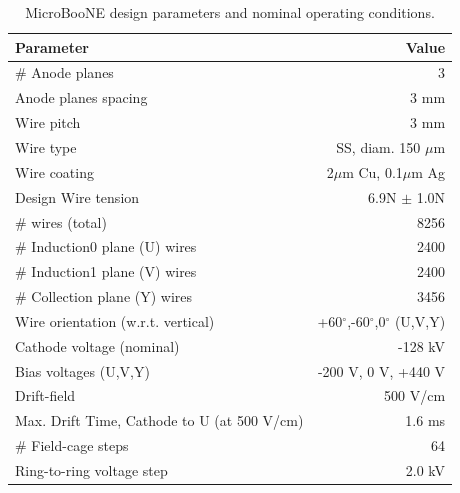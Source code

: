 \begin{table}[!htb]
   \centering
     \caption{MicroBooNE \lartpc design parameters and nominal operating conditions.} 
    \begin{tabular}{lr} %
    \hline
    Parameter & Value \\
    \hline
    $\#$ Anode planes & 3\\
     Anode planes spacing& 3 mm \\
     Wire pitch & 3 mm  \\
     Wire type & SS, diam. 150 $\mu$m\\
     Wire coating & 2$\mu$m Cu, 0.1$\mu$m Ag\\
     Design Wire tension & 6.9N $\pm$ 1.0N\\
     $\#$ wires (total) & 8256 \\
     $\#$ Induction0 plane (U) wires & 2400 \\
     $\#$ Induction1 plane (V) wires & 2400 \\
     $\#$ Collection plane (Y) wires & 3456 \\
     Wire orientation (w.r.t. vertical) & +60$^{\circ}$,-60$^{\circ}$,0$^{\circ}$ (U,V,Y) \\
     \hline
     Cathode voltage (nominal) & -128 kV \\
     Bias voltages (U,V,Y) & -200 V, 0 V, +440 V \\
     Drift-field & 500 V/cm\\
     Max. Drift Time, Cathode to U (at 500 V/cm) & 1.6 ms\\
    \hline
    $\#$ Field-cage steps & 64\\
    Ring-to-ring voltage step & 2.0 kV\\
    \hline
   \end{tabular}
   \label{tab:tpcparam}
\end{table} 


